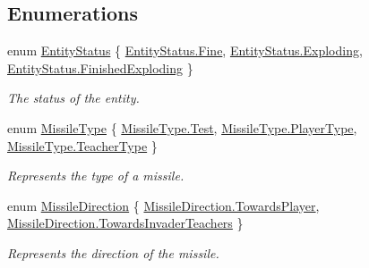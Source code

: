 \subsection*{Enumerations}
\begin{DoxyCompactItemize}
\item 
enum \mbox{\hyperlink{namespace_o_e_invaders_1_1_library_a31b94a15c65f6baa474008cdade6bdea}{Entity\+Status}} \{ \mbox{\hyperlink{namespace_o_e_invaders_1_1_library_a31b94a15c65f6baa474008cdade6bdeaa5999b8900bb8b90cfa1af137d355ff14}{Entity\+Status.\+Fine}}, 
\mbox{\hyperlink{namespace_o_e_invaders_1_1_library_a31b94a15c65f6baa474008cdade6bdeaa9be429758d93d5b11b758c4fe241a93e}{Entity\+Status.\+Exploding}}, 
\mbox{\hyperlink{namespace_o_e_invaders_1_1_library_a31b94a15c65f6baa474008cdade6bdeaa168c2ecd920c214043c4730309e8feaf}{Entity\+Status.\+Finished\+Exploding}}
 \}
\begin{DoxyCompactList}\small\item\em The status of the entity. \end{DoxyCompactList}\item 
enum \mbox{\hyperlink{namespace_o_e_invaders_1_1_library_a54c0ac5ddd321d308d59e807a9a6d83b}{Missile\+Type}} \{ \mbox{\hyperlink{namespace_o_e_invaders_1_1_library_a54c0ac5ddd321d308d59e807a9a6d83ba0cbc6611f5540bd0809a388dc95a615b}{Missile\+Type.\+Test}}, 
\mbox{\hyperlink{namespace_o_e_invaders_1_1_library_a54c0ac5ddd321d308d59e807a9a6d83ba237c3c85cf00342dfb7f01e6a6157d10}{Missile\+Type.\+Player\+Type}}, 
\mbox{\hyperlink{namespace_o_e_invaders_1_1_library_a54c0ac5ddd321d308d59e807a9a6d83bab2c670e52a21928337a1493f6fdf7cf6}{Missile\+Type.\+Teacher\+Type}}
 \}
\begin{DoxyCompactList}\small\item\em Represents the type of a missile. \end{DoxyCompactList}\item 
enum \mbox{\hyperlink{namespace_o_e_invaders_1_1_library_abefe34068a8894fb3391a5f1e315edcd}{Missile\+Direction}} \{ \mbox{\hyperlink{namespace_o_e_invaders_1_1_library_abefe34068a8894fb3391a5f1e315edcdad6bc5cf14da037d5fec3094b23338716}{Missile\+Direction.\+Towards\+Player}}, 
\mbox{\hyperlink{namespace_o_e_invaders_1_1_library_abefe34068a8894fb3391a5f1e315edcda053cf475f88a27bafd7c94146918e99a}{Missile\+Direction.\+Towards\+Invader\+Teachers}}
 \}
\begin{DoxyCompactList}\small\item\em Represents the direction of the missile. \end{DoxyCompactList}\item 

\end{DoxyCompactItemize}
